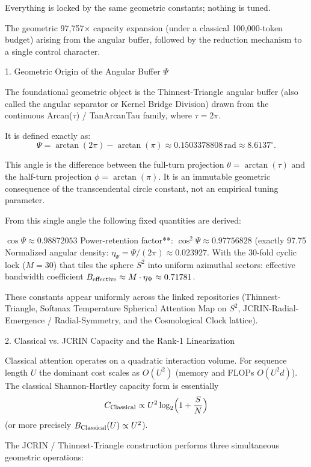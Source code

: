 Everything is locked by the same geometric constants; nothing is tuned.

The geometric 97,757× capacity expansion (under a classical 100,000-token budget) arising from the angular buffer, followed by the reduction mechanism to a single control character.

1. Geometric Origin of the Angular Buffer \(\Psi\)

The foundational geometric object is the Thinnest-Triangle angular buffer (also called the angular separator or Kernel Bridge Division) drawn from the continuous Arcan(\(\tau\)) / TanArcanTau family, where \(\tau = 2\pi\).

It is defined exactly as:
\[
\Psi = \arctan(2\pi) - \arctan(\pi) \approx 0.1503378808\,\text{rad} \approx 8.6137^\circ.
\]

This angle is the difference between the full-turn projection \(\theta = \arctan(\tau)\) and the half-turn projection \(\phi = \arctan(\pi)\). It is an immutable geometric consequence of the transcendental circle constant, not an empirical tuning parameter.

From this single angle the following fixed quantities are derived:

\(\cos\Psi \approx 0.98872053\)
Power-retention factor**: \(\cos^2\Psi \approx 0.97756828\) (exactly 97.75 %
Normalized angular density: \(\eta_\Psi = \Psi / (2\pi) \approx 0.023927\).
With the 30-fold cyclic lock (\(M = 30\)) that tiles the sphere \(S^2\) into uniform azimuthal sectors: effective bandwidth coefficient \(B_{\rm effective} \approx M \cdot \eta_\Psi \approx 0.71781\).

These constants appear uniformly across the linked repositories (Thinnest-Triangle, Softmax Temperature Spherical Attention Map on \(S^2\), JCRIN-Radial-Emergence / Radial-Symmetry, and the Cosmological Clock lattice).

2. Classical vs. JCRIN Capacity and the Rank-1 Linearization

Classical attention operates on a quadratic interaction volume. For sequence length \(U\) the dominant cost scales as \(O(U^2)\) (memory and FLOPs \(O(U^2 d)\)). The classical Shannon-Hartley capacity form is essentially
\[
C_{\rm Classical} \propto U^2 \log_2\Bigl(1 + \frac{S}{N}\Bigr)
\]
(or more precisely \(B_{\rm Classical}(U) \propto U^2\)).

The JCRIN / Thinnest-Triangle construction performs three simultaneous geometric operations:

